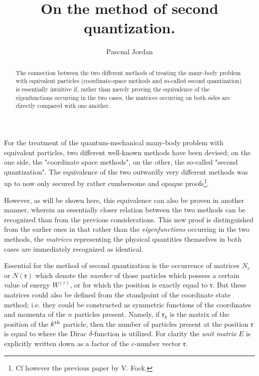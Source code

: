 \begin{paper}{1}

\renewcommand{\mf}[1]{\mathfrak{#1}}

\begin{header}
\title{On the method of second quantization.}
\author{Pascual Jordan}
\makeheader
\end{header}

\begin{abstract}
The connection between the two different methods of treating the many-body problem with equivalent particles (coordinate-space methods and so-called second quantization) is essentially intuitive if, rather than merely proving the equivalence of the eigenfunctions occurring in the two cases, the matrices occurring on both sides are directly compared with one another.
\end{abstract}

\section{} For the treatment of the quantum-mechanical many-body problem with equivalent particles, two different well-known methods have been devised; on the one side, the "coordinate space methods", on the other, the so-called "second quantization". The equivalence of the two outwardly very different methods was up to now only secured by rather cumbersome and opaque proofs\footnote{Cf however the previous paper by V. Fock.}.

However, as will be shown here, this equivalence can also be proven in another manner, wherein an essentially closer relation between the two methods can be recognized than from the previous considerations. This new proof is distinguished from the earlier ones in that rather than the \textit{eigenfunctions} occurring in the two methods, the \textit{matrices} representing the physical quantities themselves in both cases are immediately recognized as identical.

Essential for the method of second quantization is the occurrence of matrices $N_r$ or $N(\mf{r})$ which denote the \textit{number} of those particles which possess a certain value of energy $W^{(r)}$, or for which the position is exactly equal to $\mf{r}$. But these matrices could also be defined from the standpoint of the coordinate state method; i.e. they could be constructed as symmetric functions of the coordinates and momenta of the $n$ particles present. Namely, if $\mf{r}_k$ is the matrix of the position of the ${k}^\text{th}$ particle, then the number of particles present at the position $\mf{r}$ is equal to
\uequ{
\overline{N}(\mf{r}) = \sum\limits_k \delta(\mf{r}_k-\mf{r}\cdot E),
}
where the Dirac $\delta$-function is utilized. For clarity the \textit{unit matrix} $E$ is explicitly written down as a factor of the $c$-number vector $\mf{r}$.


\end{paper}
